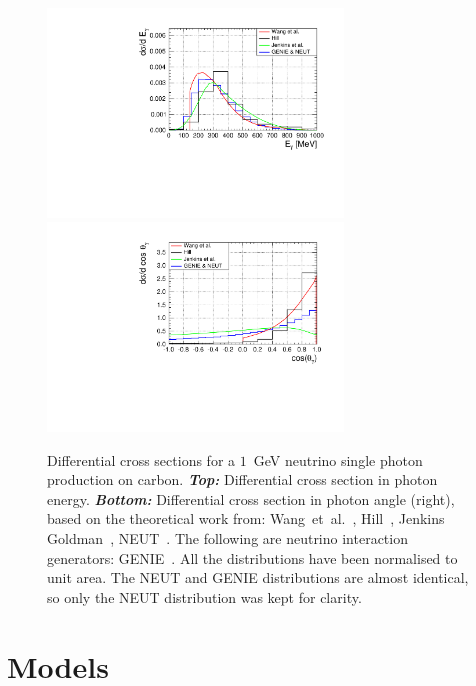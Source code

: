 \begin{figure}[ht]
  \center
  \includegraphics[width=0.7\textwidth]{images/Pheno/NCG_Diff_ene.pdf}
  \includegraphics[width=0.7\textwidth]{images/Pheno/NCG_Diff_cos.pdf}
  \caption[Differential cross sections for a 1~GeV neutrino single
  photon production on carbon]{Differential cross sections for a
    $1$~GeV neutrino single photon production on
    carbon. \textbf{\textit{Top:}} Differential cross section in
    photon energy. \textbf{\textit{Bottom:}} Differential cross
    section in photon angle (right), based on the theoretical work
    from: Wang~et~al.~\cite{Alvarez2014}, Hill~\cite{Hills2007},
    Jenkins Goldman~\cite{Jenkins}, \Gls{NEUT}~\cite{NEUT}. The
    following are neutrino interaction generators:
    \Gls{GENIE}~\cite{GENIE1,GENIE2}. All the distributions have been
    normalised to unit area. The \Gls{NEUT} and \Gls{GENIE}
    distributions are almost identical, so only the \Gls{NEUT}
    distribution was kept for clarity.}
  \label{fig:diffncg}
\end{figure}
\clearpage

\section{Models}
\label{sec:models}

